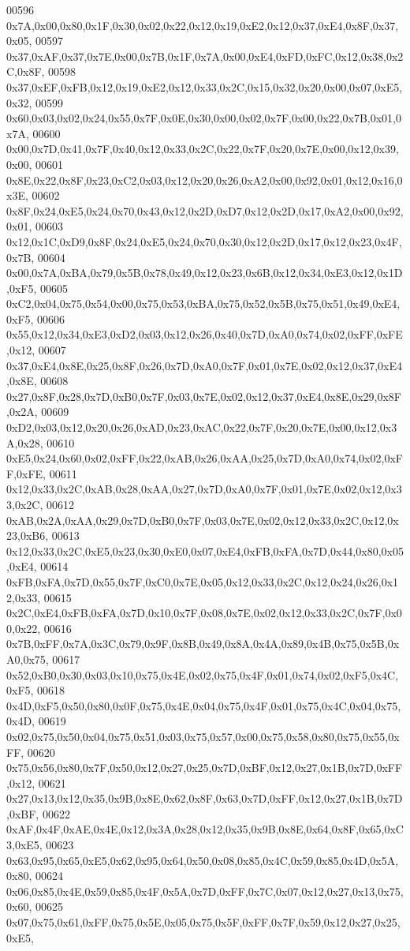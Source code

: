 \begin{DoxyCode}
00596 0x7A,0x00,0x80,0x1F,0x30,0x02,0x22,0x12,0x19,0xE2,0x12,0x37,0xE4,0x8F,0x37,0x05,
00597 0x37,0xAF,0x37,0x7E,0x00,0x7B,0x1F,0x7A,0x00,0xE4,0xFD,0xFC,0x12,0x38,0x2C,0x8F,
00598 0x37,0xEF,0xFB,0x12,0x19,0xE2,0x12,0x33,0x2C,0x15,0x32,0x20,0x00,0x07,0xE5,0x32,
00599 0x60,0x03,0x02,0x24,0x55,0x7F,0x0E,0x30,0x00,0x02,0x7F,0x00,0x22,0x7B,0x01,0x7A,
00600 0x00,0x7D,0x41,0x7F,0x40,0x12,0x33,0x2C,0x22,0x7F,0x20,0x7E,0x00,0x12,0x39,0x00,
00601 0x8E,0x22,0x8F,0x23,0xC2,0x03,0x12,0x20,0x26,0xA2,0x00,0x92,0x01,0x12,0x16,0x3E,
00602 0x8F,0x24,0xE5,0x24,0x70,0x43,0x12,0x2D,0xD7,0x12,0x2D,0x17,0xA2,0x00,0x92,0x01,
00603 0x12,0x1C,0xD9,0x8F,0x24,0xE5,0x24,0x70,0x30,0x12,0x2D,0x17,0x12,0x23,0x4F,0x7B,
00604 0x00,0x7A,0xBA,0x79,0x5B,0x78,0x49,0x12,0x23,0x6B,0x12,0x34,0xE3,0x12,0x1D,0xF5,
00605 0xC2,0x04,0x75,0x54,0x00,0x75,0x53,0xBA,0x75,0x52,0x5B,0x75,0x51,0x49,0xE4,0xF5,
00606 0x55,0x12,0x34,0xE3,0xD2,0x03,0x12,0x26,0x40,0x7D,0xA0,0x74,0x02,0xFF,0xFE,0x12,
00607 0x37,0xE4,0x8E,0x25,0x8F,0x26,0x7D,0xA0,0x7F,0x01,0x7E,0x02,0x12,0x37,0xE4,0x8E,
00608 0x27,0x8F,0x28,0x7D,0xB0,0x7F,0x03,0x7E,0x02,0x12,0x37,0xE4,0x8E,0x29,0x8F,0x2A,
00609 0xD2,0x03,0x12,0x20,0x26,0xAD,0x23,0xAC,0x22,0x7F,0x20,0x7E,0x00,0x12,0x3A,0x28,
00610 0xE5,0x24,0x60,0x02,0xFF,0x22,0xAB,0x26,0xAA,0x25,0x7D,0xA0,0x74,0x02,0xFF,0xFE,
00611 0x12,0x33,0x2C,0xAB,0x28,0xAA,0x27,0x7D,0xA0,0x7F,0x01,0x7E,0x02,0x12,0x33,0x2C,
00612 0xAB,0x2A,0xAA,0x29,0x7D,0xB0,0x7F,0x03,0x7E,0x02,0x12,0x33,0x2C,0x12,0x23,0xB6,
00613 0x12,0x33,0x2C,0xE5,0x23,0x30,0xE0,0x07,0xE4,0xFB,0xFA,0x7D,0x44,0x80,0x05,0xE4,
00614 0xFB,0xFA,0x7D,0x55,0x7F,0xC0,0x7E,0x05,0x12,0x33,0x2C,0x12,0x24,0x26,0x12,0x33,
00615 0x2C,0xE4,0xFB,0xFA,0x7D,0x10,0x7F,0x08,0x7E,0x02,0x12,0x33,0x2C,0x7F,0x00,0x22,
00616 0x7B,0xFF,0x7A,0x3C,0x79,0x9F,0x8B,0x49,0x8A,0x4A,0x89,0x4B,0x75,0x5B,0xA0,0x75,
00617 0x52,0xB0,0x30,0x03,0x10,0x75,0x4E,0x02,0x75,0x4F,0x01,0x74,0x02,0xF5,0x4C,0xF5,
00618 0x4D,0xF5,0x50,0x80,0x0F,0x75,0x4E,0x04,0x75,0x4F,0x01,0x75,0x4C,0x04,0x75,0x4D,
00619 0x02,0x75,0x50,0x04,0x75,0x51,0x03,0x75,0x57,0x00,0x75,0x58,0x80,0x75,0x55,0xFF,
00620 0x75,0x56,0x80,0x7F,0x50,0x12,0x27,0x25,0x7D,0xBF,0x12,0x27,0x1B,0x7D,0xFF,0x12,
00621 0x27,0x13,0x12,0x35,0x9B,0x8E,0x62,0x8F,0x63,0x7D,0xFF,0x12,0x27,0x1B,0x7D,0xBF,
00622 0xAF,0x4F,0xAE,0x4E,0x12,0x3A,0x28,0x12,0x35,0x9B,0x8E,0x64,0x8F,0x65,0xC3,0xE5,
00623 0x63,0x95,0x65,0xE5,0x62,0x95,0x64,0x50,0x08,0x85,0x4C,0x59,0x85,0x4D,0x5A,0x80,
00624 0x06,0x85,0x4E,0x59,0x85,0x4F,0x5A,0x7D,0xFF,0x7C,0x07,0x12,0x27,0x13,0x75,0x60,
00625 0x07,0x75,0x61,0xFF,0x75,0x5E,0x05,0x75,0x5F,0xFF,0x7F,0x59,0x12,0x27,0x25,0xE5,

\end{DoxyCode}

